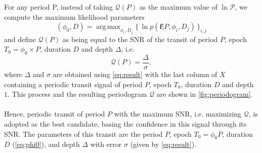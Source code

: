 \documentclass[modern,linenumbers]{aastex631}
\newcommand{\set}[1]{\{\,#1\,\}}
\DeclareMathOperator*{\argmax}{arg\,max}
\begin{document}
For any period P, instead of taking $ \mathcal{Q}(P)$ as the maximum value of $\ln\mathcal{P}$, we compute the maximum likelihood parameters
\begin{equation}\label{eq:phi0}
    (\phi_0 ,D) = \argmax_{\phi_i, D_j} \set{\ln p(\bm{f} \vert P, \phi_i, D_j)}_{i, j}
\end{equation}
and define $\mathcal{Q}(P)$ as being equal to the SNR of the transit of period $P$, epoch $T_0 = \phi_0 \times P$, duration $D$ and depth $\Delta$, i.e.
\begin{equation*}
    \mathcal{Q}(P) = \frac{\Delta}{\sigma},
\end{equation*}
where $\Delta$ and $\sigma$ are obtained using \autoref{eq:result} with the last column of $X$ containing a periodic transit signal of period $P$, epoch $T_0$, duration $D$ and depth $1$. This process and the resulting periodogram $\mathcal{Q}$ are shown in \autoref{fig:periodogram}.\\\\
Hence, periodic transit of period $P$ with the maximum SNR, i.e. maximizing $\mathcal{Q}$, is adopted as the best candidate, basing the confidence in this signal through its SNR. The parameters of this transit are the period $P$, epoch $T_0 = \phi_0 P$, duration $D$ (\autoref{eq:phi0}), and depth $\Delta$ with error $\sigma$ (given by \autoref{eq:result}).\\\\
\end{document}
